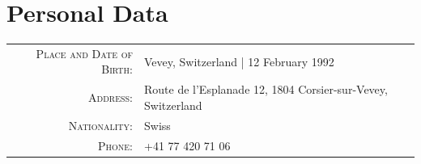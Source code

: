 \documentclass[a4paper,11pt]{article} %
\begin{document}

\section{Personal Data}
\begin{center}
\begin{tabular}{rl}
\textsc{Place and Date of Birth:} & Vevey, Switzerland  | 12 February 1992 \\
\textsc{Address:} & Route de l'Esplanade 12, 1804 Corsier-sur-Vevey, Switzerland \\
\textsc{Nationality:} & Swiss \\
\textsc{Phone:} & +41 77 420 71 06\\
\end{tabular}
\end{center}
\end{document}
